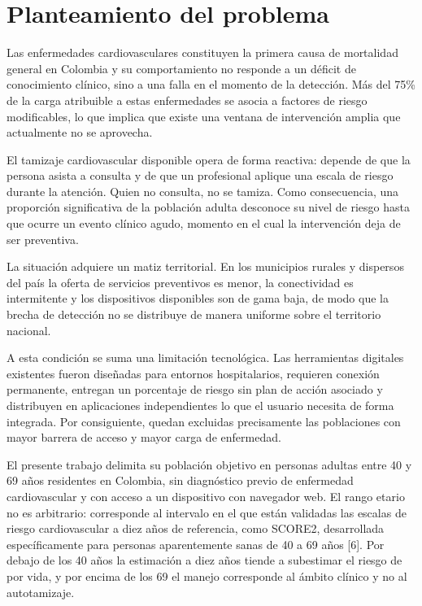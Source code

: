 \documentclass[conference]{IEEEtran}
\begin{document}
\section{Planteamiento del problema}
Las enfermedades cardiovasculares constituyen la primera causa de mortalidad general en Colombia y su comportamiento no responde a un déficit de conocimiento clínico, sino a una falla en el momento de la detección. Más del 75\% de la carga atribuible a estas enfermedades se asocia a factores de riesgo modificables, lo que implica que existe una ventana de intervención amplia que actualmente no se aprovecha.

El tamizaje cardiovascular disponible opera de forma reactiva: depende de que la persona asista a consulta y de que un profesional aplique una escala de riesgo durante la atención. Quien no consulta, no se tamiza. Como consecuencia, una proporción significativa de la población adulta desconoce su nivel de riesgo hasta que ocurre un evento clínico agudo, momento en el cual la intervención deja de ser preventiva.

La situación adquiere un matiz territorial. En los municipios rurales y dispersos del país la oferta de servicios preventivos es menor, la conectividad es intermitente y los dispositivos disponibles son de gama baja, de modo que la brecha de detección no se distribuye de manera uniforme sobre el territorio nacional.

A esta condición se suma una limitación tecnológica. Las herramientas digitales existentes fueron diseñadas para entornos hospitalarios, requieren conexión permanente, entregan un porcentaje de riesgo sin plan de acción asociado y distribuyen en aplicaciones independientes lo que el usuario necesita de forma integrada. Por consiguiente, quedan excluidas precisamente las poblaciones con mayor barrera de acceso y mayor carga de enfermedad.

El presente trabajo delimita su población objetivo en personas adultas entre 40 y 69 años residentes en Colombia, sin diagnóstico previo de enfermedad cardiovascular y con acceso a un dispositivo con navegador web. El rango etario no es arbitrario: corresponde al intervalo en el que están validadas las escalas de riesgo cardiovascular a diez años de referencia, como SCORE2, desarrollada específicamente para personas aparentemente sanas de 40 a 69 años [6]. Por debajo de los 40 años la estimación a diez años tiende a subestimar el riesgo de por vida, y por encima de los 69 el manejo corresponde al ámbito clínico y no al autotamizaje.
\end{document}
